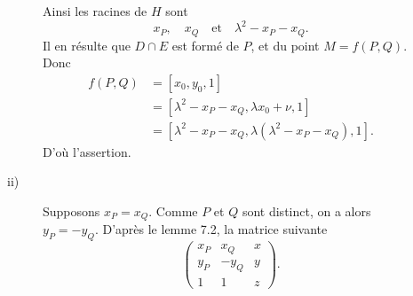 \begin{demonstration}
\begin{description}
\begin{description}
           Ainsi les racines de $H$ sont
           \[
           x_P, \quad x_Q \quad \text{et} \quad \lambda^2 - x_P - x_Q
           .\] 
           Il en résulte que $D \cap E$ est formé de $P$, et du point $M = f(P,Q)$.
           Donc  
           \begin{align*}
               f(P,Q) &= \left[ x_0, y_0, 1 \right] \\
                      &= \left[ \lambda^2 - x_P - x_Q, \lambda x_0 + \nu, 1 \right] \\
                      &= \left[ \lambda^2 - x_P - x_Q, \lambda\left( \lambda^2 - x_P - x_Q \right), 1\right]
           .\end{align*}
           D'où l'assertion.
       \item[ii)] Supposons $x_P = x_Q$. Comme $P$ et $Q$ sont distinct, on a alors $y_P = - y_Q$.
               D'après le lemme 7.2, la matrice suivante
               \[
                   \begin{pmatrix} x_P & x_Q & x \\
                   y_P & - y_Q & y \\
               1 & 1 & z
           \end{pmatrix} 
               .\] 


\end{description}
\end{description}
\end{demonstration}
